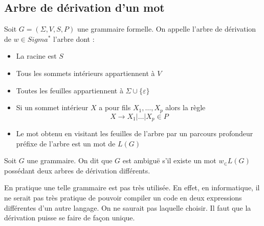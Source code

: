 \subsection{Arbre de dérivation d'un mot}

\begin{definition}
    Soit $ G = (\Sigma, V, S, P)$ une grammaire formelle. On appelle l'arbre de dérivation de $w \in Sigma^*$ l'arbre dont :
    \begin{itemize}
        \item La racine est $S$ 
        \item Tous les sommets intérieurs appartiennent à $V$ 
        \item Toutes les feuilles appartiennent à $\Sigma \cup \{\varepsilon\}$ 
        \item Si un sommet intérieur $X$ a pour fils $X_1, \dots, X_p$ alors la règle 
            \[ X \longrightarrow X_1 | \dots | X_p \in P \] 
        \item Le mot obtenu en visitant les feuilles de l'arbre par un parcours profondeur préfixe de l'arbre 
            est un mot de $L(G)$
    \end{itemize}
\end{definition}

\begin{definition}
    Soit $G$ une grammaire. On dit que $G$ est ambiguë s'il existe un mot $w_ \in L(G)$ possédant
    deux arbres de dérivation différents. 
\end{definition}

En pratique une telle grammaire est pas très utilisée. En effet, en informatique, il ne serait pas très pratique 
de pouvoir compiler un code en deux expressions différentes d'un autre langage. On ne saurait pas laquelle choisir. 
Il faut que la dérivation puisse se faire de façon unique.

